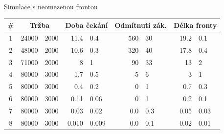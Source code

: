 \begin{frame}{Simulace s neomezenou frontou}
\small
\begin{tabular}{c|r@{$\pm$}l|r@{$\pm$}l|r@{$\pm$}l|r@{$\pm$}l}
	\#  & \multicolumn{2}{|c|}{Tržba} & \multicolumn{2}{|c|}{Doba čekání} & \multicolumn{2}{|c|}{Odmítnutí zák.} & \multicolumn{2}{|c}{Délka fronty}\\ \hline\hline	
	1 &   24000 & 2000  &   11.4   &  0.4    &  560   & 30    &  19.2  & 0.1  \\
	2 &   48000 & 2000  &   10.6   &  0.3    &  320   & 40    &  17.8  & 0.4  \\
	3 &   71000 & 2000  &    8     &  1      &   90   & 33    &  13    & 2    \\
	4 &   80000 & 3000  &    1.7   &  0.5    &    5   &  6    &   3    & 1    \\
	5 &   80000 & 3000  &    0.4   &  0.2    &    0   &  1    &   0.7  & 0.3  \\
	6 &   80000 & 3000  &    0.11  &  0.06   &    0   &  1    &   0.2  & 0.1  \\
	7 &   80000 & 3000  &    0.03  &  0.02   &    0.0 &  0.3  &   0.05 & 0.03 \\
	8 &   80000 & 3000  &    0.010 &  0.009  &    0.0 &  0.1  &   0.02 & 0.01 
\end{tabular}
\end{frame}


